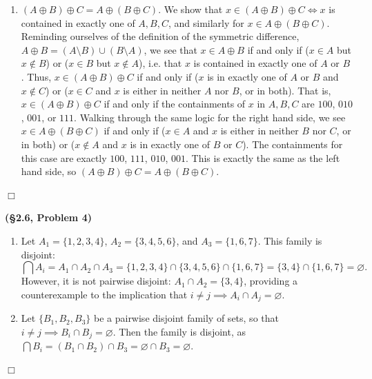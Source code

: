 \documentclass[12pt]{article}
\theoremstyle{definition}
\newenvironment{Solution}{\noindent {\sc Solution.}}{$\Box$ \vspace{2 ex}}
\begin{document}
\begin{Solution}
\begin{enumerate}[label=\alph*.]
\item $(A \oplus B)\oplus C = A \oplus (B\oplus C)$. We show that $x \in (A \oplus B)\oplus C \iff x$ is contained in exactly one of $A, B, C$, and similarly for $x \in A \oplus (B\oplus C)$. Reminding ourselves of the definition of the symmetric difference, $A\oplus B = (A\setminus B) \cup (B\setminus A)$, we see that $x \in A\oplus B$ if and only if ($x \in A$ but $x \not\in B$) or ($x \in B$ but $x \not \in A$), i.e. that $x$ is contained in exactly one of $A$ or $B$. Thus, $x \in (A\oplus B)\oplus C$ if and only if ($x$ is in exactly one of $A$ or $B$ and $x \not\in C$) or ($x \in C$ and $x$ is either in neither $A$ nor $B$, or in both). That is, $x \in (A\oplus B)\oplus C$ if and only if the containments of $x$ in $A,B,C$ are $100$, $010$, $001$, or $111$. Walking through the same logic for the right hand side, we see $x \in A \oplus (B\oplus C)$ if and only if ($x \in A$ and $x$ is either in neither $B$ nor $C$, or in both) or ($x \not \in A$ and $x$ is in exactly one of $B$ or $C$). The containments for this case are exactly $100$, $111$, $010$, $001$. This is exactly the same as the left hand side, so $(A\oplus B)\oplus C = A \oplus (B\oplus C)$.
\end{enumerate}
\end{Solution}


\vspace{1cm}

\begin{Solution}
{\bf (\S2.6, Problem 4)}\\
\begin{enumerate}[label=\alph*.]
\item Let $A_1 = \{1,2,3,4\}$, $A_2 = \{3,4,5,6\}$, and $A_3 = \{1,6,7\}$. This family is disjoint: \[\bigcap A_i = A_1 \cap A_2 \cap A_3 = \{1,2,3,4\} \cap \{3,4,5,6\} \cap \{1,6,7\}=\{3,4\}\cap \{1,6,7\}=\varnothing.\] However, it is not pairwise disjoint: $A_1 \cap A_2 = \{3,4\}$, providing a counterexample to the implication that $i\ne j\implies A_i \cap A_j =\varnothing$. 
\item Let $\{B_1, B_2, B_3\}$ be a pairwise disjoint family of sets, so that $i\ne j \implies B_i \cap B_j = \varnothing$. Then the family is disjoint, as $\bigcap B_i = (B_1\cap B_2)\cap B_3 = \varnothing \cap B_3=\varnothing$.
\end{enumerate}
\end{Solution} 


\vspace{1cm}
\end{document}
